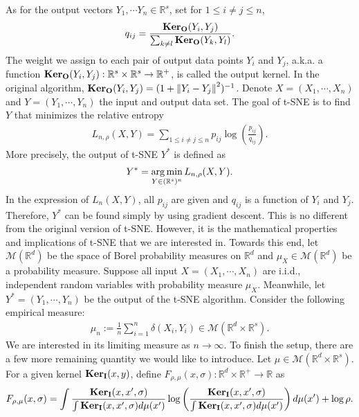 As for the output vectors $Y_1, \cdots Y_n \in \mathbb{R}^s$, set for $1 \leq i \neq j \leq n$,
\begin{align}
    q_{ij} = \frac{\mathbf{Ker}_{\mathbf{O}}(Y_i,Y_j)}{\sum_{k \neq l}\mathbf{Ker}_{\mathbf{O}}(Y_k,Y_l)}.
\end{align}
The weight we assign to each pair of output data points $Y_i$ and $Y_j$, a.k.a. a function $\mathbf{Ker}_{\mathbf{O}}(Y_i,Y_j):\mathbb{R}^s \times \mathbb{R}^s \to \mathbb{R}^+$, is called the output kernel. In the original algorithm, $\mathbf{Ker}_{\mathbf{O}}(Y_i,Y_j) = (1+\left\lVert Y_i-Y_j\right\rVert^2)^{-1}$. Denote $X = (X_1,\cdots,X_n)$ and $Y = (Y_1,\cdots,Y_n)$ the input and output data set. The goal of t-SNE is to find $Y$ that minimizes the relative entropy
\begin{align}
    L_{n,\rho}(X,Y) = \sum_{1 \leq i \neq j \leq n} p_{ij} \log \left(\frac{p_{ij}}{q_{ij}}\right).
\end{align}
More precisely, the output of t-SNE $Y^*$ is defined as
\begin{align}
    Y^* = \operatorname*{arg\,min}_{Y \in (\mathbb{R}^s)^n}L_{n,\rho}(X,Y).
\end{align}
In the expression of $L_n(X,Y)$, all $p_{ij}$ are given and $q_{ij}$ is a function of $Y_i$ and $Y_j$. Therefore, $Y^*$ can be found simply by using gradient descent. This is no different from the original version of t-SNE. However, it is the mathematical properties and implications of t-SNE that we are interested in. Towards this end, let $\mathcal{M}(\mathbb{R}^d)$ be the space of Borel probability measures on $\mathbb{R}^d$ and $\mu_X \in \mathcal{M}(\mathbb{R}^d)$ be a probability measure. Suppose all input $X = (X_1,\cdots,X_n)$ are i.i.d., independent random variables with probability measure $\mu_X$. Meanwhile, let $Y^* = (Y_1,\cdots,Y_n)$ be the output of the t-SNE algorithm. Consider the following empirical measure:
\begin{align}
    \mu_n := \frac{1}{n} \sum_{i=1}^n \delta(X_i,Y_i) \in \mathcal{M}(\mathbb{R}^d \times \mathbb{R}^s).
\end{align}
We are interested in its limiting measure as $n \to \infty$. To finish the setup, there are a few more remaining quantity we would like to introduce. Let $\mu \in \mathcal{M}(\mathbb{R}^d \times \mathbb{R}^s)$. For a given kernel $\mathbf{Ker}_{\mathbf{I}}(x,y)$, define $F_{\rho,\mu}(x,\sigma) : \mathbb{R}^d \times \mathbb{R}^+ \to \mathbb{R}$ as
\begin{align}
    F_{\rho,\mu}(x,\sigma) = \int \frac{\mathbf{Ker}_{\mathbf{I}}(x,x',\sigma)}{\int \mathbf{Ker}_{\mathbf{I}}(x,x',\sigma)d\mu(x')} \log \left(\frac{\mathbf{Ker}_{\mathbf{I}}(x,x',\sigma)}{\int \mathbf{Ker}_{\mathbf{I}}(x,x',\sigma)d\mu(x')}\right) d\mu(x') + \log \rho.
\end{align}

